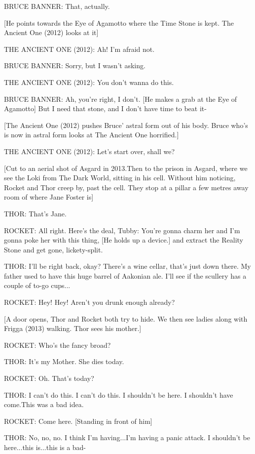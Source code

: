 BRUCE BANNER: That, actually.

[He points towards the Eye of Agamotto where the Time Stone is kept. The Ancient One (2012) looks at it]

THE ANCIENT ONE (2012): Ah! I'm afraid not.

BRUCE BANNER: Sorry, but I wasn't asking.

THE ANCIENT ONE (2012): You don't wanna do this.

BRUCE BANNER: Ah, you're right, I don't. [He makes a grab at the Eye of Agamotto] But I need that stone, and I don't have time to beat it-

[The Ancient One (2012) pushes Bruce' astral form out of his body. Bruce who's is now in astral form looks at The Ancient One horrified.]

THE ANCIENT ONE (2012): Let's start over, shall we?

[Cut to an aerial shot of Asgard in 2013.Then to the prison in Asgard, where we see the Loki from The Dark World, sitting in his cell. Without him noticing, Rocket and Thor creep by, past the cell. They stop at a pillar a few metres away room of where Jane Foster is]

THOR: That's Jane.

ROCKET: All right. Here's the deal, Tubby: You're gonna charm her and I'm gonna poke her with this thing, [He holds up a device.] and extract the Reality Stone and get gone, lickety-split.

THOR: I'll be right back, okay? There's a wine cellar, that's just down there. My father used to have this huge barrel of Aakonian ale. I'll see if the scullery has a couple of to-go cups...

ROCKET: Hey! Hey! Aren't you drunk enough already?

[A door opens, Thor and Rocket both try to hide. We then see ladies along with Frigga (2013) walking. Thor sees his mother.]

ROCKET: Who's the fancy broad?

THOR: It's my Mother. She dies today.

ROCKET: Oh. That's today?

THOR: I can't do this. I can't do this. I shouldn't be here. I shouldn't have come.This was a bad idea.

ROCKET: Come here. [Standing in front of him]

THOR: No, no, no. I think I'm having...I'm having a panic attack. I shouldn't be here...this is...this is a bad-

